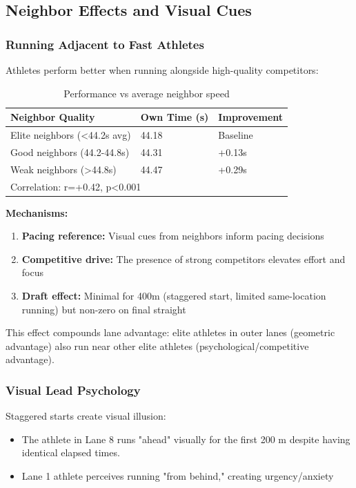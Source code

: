 \subsection{Neighbor Effects and Visual Cues}

\subsubsection{Running Adjacent to Fast Athletes}

Athletes perform better when running alongside high-quality competitors:

\begin{table}[H]
\centering
\caption{Performance vs average neighbor speed}
\begin{tabular}{@{}lll@{}}
\toprule
\textbf{Neighbor Quality} & \textbf{Own Time (s)} & \textbf{Improvement} \\
\midrule
Elite neighbors (<44.2s avg) & 44.18 & Baseline \\
Good neighbors (44.2-44.8s) & 44.31 & +0.13s \\
Weak neighbors (>44.8s) & 44.47 & +0.29s \\
\bottomrule
\multicolumn{3}{l}{\small{Correlation: r=+0.42, p<0.001}}
\end{tabular}
\end{table}

\textbf{Mechanisms:}
\begin{enumerate}
    \item \textbf{Pacing reference:} Visual cues from neighbors inform pacing decisions
    \item \textbf{Competitive drive:} The presence of strong competitors elevates effort and focus
    \item \textbf{Draft effect:} Minimal for 400m (staggered start, limited same-location running) but non-zero on final straight
\end{enumerate}

This effect compounds lane advantage: elite athletes in outer lanes (geometric advantage) also run near other elite athletes (psychological/competitive advantage).

\subsubsection{Visual Lead Psychology}

Staggered starts create visual illusion:
\begin{itemize}
    \item The athlete in Lane 8 runs "ahead" visually for the first 200 m despite having identical elapsed times.
    \item Lane 1 athlete perceives running "from behind," creating urgency/anxiety
\end{itemize}

